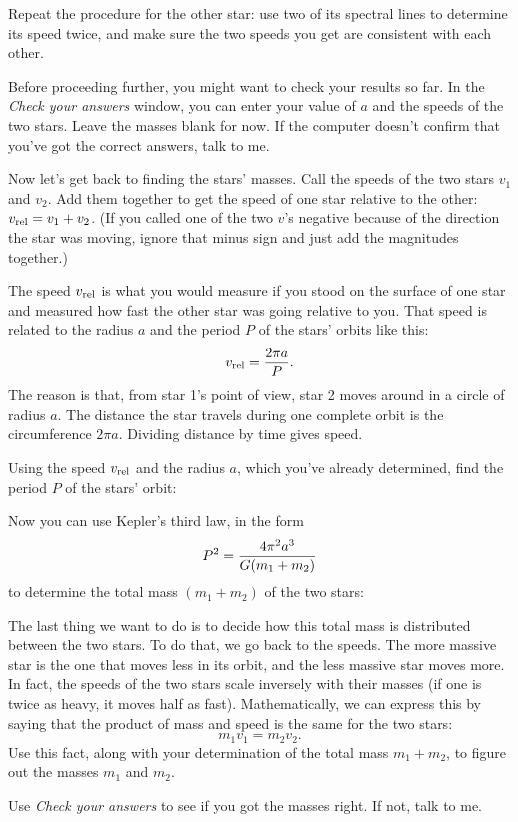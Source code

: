 \vskip 2in

Repeat the procedure for the other star: use two of its spectral lines
to determine its speed twice, and make sure the two speeds you get
are consistent with each other.

\vskip 2in

Before proceeding further, you might want to check your results
so far.  In the {\it Check your answers} window, 
you can enter your value of $a$ and the speeds of the two stars.
Leave the masses blank for now.  If the computer doesn't
confirm that you've got the correct answers, talk to me.

Now let's get back to finding the stars' masses.
Call the speeds of the two stars $v_1$ and $v_2$.  Add them together
to get the speed of one star relative to the other:
$v_{\rm rel}=v_1+v_2$.   (If you called one of the two $v$'s negative
because of the direction the star was moving, ignore that minus sign
and just add the magnitudes together.)

\vskip 1in


The speed $v_{\rm rel}$ is what you would measure if you stood
on the surface of one star and measured how fast the other star was
going relative to you.  That speed is related to the radius $a$ 
and the period $P$ of the
stars' orbits like this:
$$
v_{\rm rel}={2\pi a\over P}.
$$
The reason is that, from star 1's point of view, star 2 moves around
in a circle of radius $a$.  The distance the star travels during one
complete orbit is the circumference $2\pi a$.  Dividing distance by time
gives speed.

Using
the speed $v_{\rm rel}$ and the radius $a$, which you've already determined,
find the period $P$ of the stars' orbit:

\vfil\eject


Now you can use Kepler's third law, in the form
$$
P^2={4\pi^2 a^3\over G(m_1+m_2)}
$$
to determine the total mass $(m_1+m_2)$ of the two stars:

\vskip 2in

The last thing we want to do is to decide how this total mass is distributed
between the two stars.  To do that, we go back to the speeds.
The more massive star is the one that moves less in its orbit,
and the less massive star moves more.  In fact, the speeds of the
two stars scale inversely with their masses (if one is twice
as heavy, it moves half as fast). Mathematically, we can express
this by saying that the product of mass and speed is the same
for the two stars:
$$
m_1v_1=m_2v_2.
$$
Use this fact, along with your determination of the total mass $m_1+m_2$,
to figure out the masses $m_1$ and $m_2$.  

\vskip 2in

Use \textit{Check your answers} to see if you got the masses right. If
not, talk to me.

